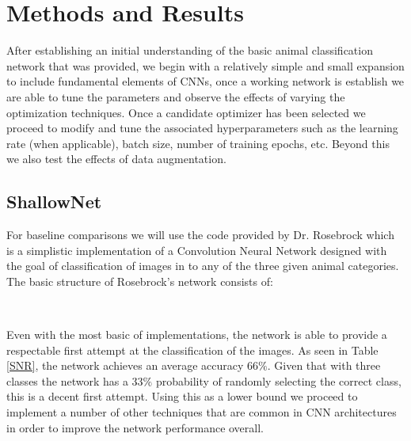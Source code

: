 \documentclass[12pt]{article}
\begin{document}
\section{Methods and Results}
After establishing an initial understanding of the basic  animal classification network that was provided, we begin with a relatively simple and small expansion to include fundamental elements of CNNs, once a working network is establish we are able to tune the parameters and observe the effects of varying the optimization techniques. Once a candidate optimizer has been selected we proceed to modify and tune the associated hyperparameters such as the learning rate (when applicable), batch size, number of training epochs, etc. Beyond this we also test the effects of data augmentation. 

\subsection{ShallowNet}
For baseline comparisons we will use the code provided by Dr. Rosebrock \cite{rosebrock} which is a simplistic implementation of a Convolution Neural Network designed with the goal of classification of images in to any of the three given animal categories. The basic structure of Rosebrock's network consists of:
\begin{center}
	 \\
\end{center}
Even with the most basic of implementations, the network is able to provide a respectable first attempt at the classification of the images. As seen in Table \ref{SNR}, the network achieves an average accuracy $66\%$. Given that with three classes the network has a $33\%$ probability of randomly selecting the correct class, this is a decent first attempt. Using this as a lower bound we proceed to implement a number of other techniques that are common in CNN architectures in order to improve the network performance overall. 
\end{document}
